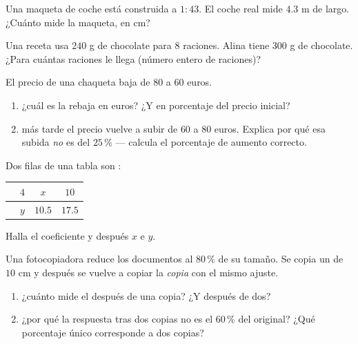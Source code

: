 \begin{exercise}[$\star$]\label{exo:g7:prop:7}
Una maqueta de coche está construida a  $1 : 43$. El coche real mide $4.3$ m de largo.
¿Cuánto mide la maqueta, en cm?
\end{exercise}

\begin{exercise}[$\star\star$]\label{exo:g7:prop:8}
Una receta usa $240$ g de chocolate para $8$ raciones. Alina tiene
$300$ g de chocolate. ¿Para cuántas raciones le llega (número
entero de raciones)?
\end{exercise}

\begin{exercise}[$\star\star$]\label{exo:g7:prop:9}
El precio de una chaqueta baja de $80$ a $60$ euros.
\begin{enumerate}
  \item ¿cuál es la rebaja en euros? ¿Y en porcentaje del precio
        inicial?
  \item más tarde el precio vuelve a subir de $60$ a $80$ euros. Explica
        por qué esa subida \emph{no} es del $25\,\%$ --- calcula el
        porcentaje de aumento correcto.
\end{enumerate}
\end{exercise}

\begin{exercise}[$\star\star$]\label{exo:g7:prop:10}
Dos filas de una tabla son :
\begin{center}
\renewcommand{\arraystretch}{1.2}
\begin{tabular}{l|ccc}
 & $4$ & $x$ & $10$ \\
\hline
 & $y$ & $10.5$ & $17.5$ \\
\end{tabular}
\end{center}
Halla el coeficiente y después $x$ e $y$.
\end{exercise}

\begin{exercise}[$\star\star\star$]\label{exo:g7:prop:11}
Una fotocopiadora reduce los documentos al $80\,\%$ de su tamaño. Se copia un 
de $10$ cm y después se vuelve a copiar la \emph{copia} con el
mismo ajuste.
\begin{enumerate}
  \item ¿cuánto mide el  después de una copia? ¿Y después de dos?
  \item ¿por qué la respuesta tras dos copias no es el $60\,\%$ del
        original? ¿Qué porcentaje único corresponde a dos copias?
\end{enumerate}
\end{exercise}

